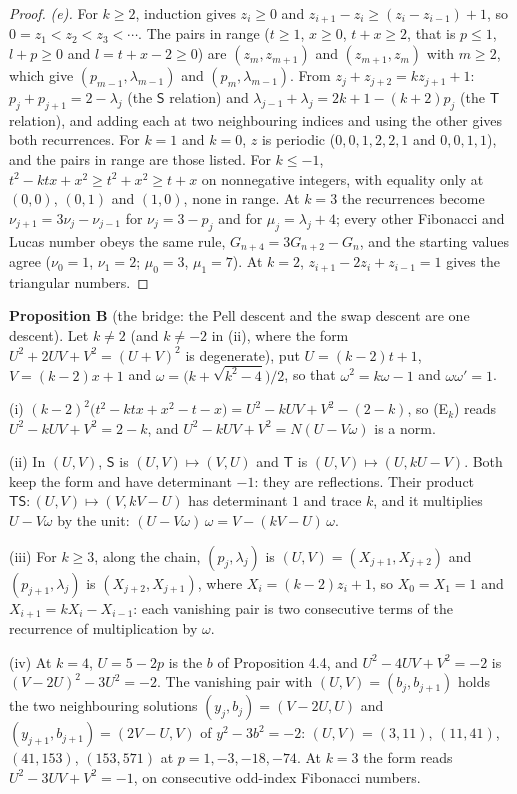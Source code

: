 \documentclass[11pt]{article}
\begin{document}
\begin{proof}
\emph{(e).} For $k\ge2$, induction gives $z_i\ge0$ and $z_{i+1}-z_i\ge(z_i-z_{i-1})+1$, so $0=z_1<z_2<z_3<\cdots$. The pairs in range ($t\ge1$, $x\ge0$, $t+x\ge2$, that is $p\le1$, $l+p\ge0$ and $l=t+x-2\ge0$) are $(z_m,z_{m+1})$ and $(z_{m+1},z_m)$ with $m\ge2$, which give $(p_{m-1},\lambda_{m-1})$ and $(p_m,\lambda_{m-1})$. From $z_j+z_{j+2}=kz_{j+1}+1$: $p_j+p_{j+1}=2-\lambda_j$ (the $\mathsf{S}$ relation) and $\lambda_{j-1}+\lambda_j=2k+1-(k+2)p_j$ (the $\mathsf{T}$ relation), and adding each at two neighbouring indices and using the other gives both recurrences. For $k=1$ and $k=0$, $z$ is periodic ($0,0,1,2,2,1$ and $0,0,1,1$), and the pairs in range are those listed. For $k\le-1$, $t^2-ktx+x^2\ge t^2+x^2\ge t+x$ on nonnegative integers, with equality only at $(0,0)$, $(0,1)$ and $(1,0)$, none in range. At $k=3$ the recurrences become $\nu_{j+1}=3\nu_j-\nu_{j-1}$ for $\nu_j=3-p_j$ and for $\mu_j=\lambda_j+4$; every other Fibonacci and Lucas number obeys the same rule, $G_{n+4}=3G_{n+2}-G_n$, and the starting values agree ($\nu_0=1$, $\nu_1=2$; $\mu_0=3$, $\mu_1=7$). At $k=2$, $z_{i+1}-2z_i+z_{i-1}=1$ gives the triangular numbers.
\end{proof}

\noindent\textbf{Proposition B} (the bridge: the Pell descent and the swap descent are one descent). Let $k\ne2$ (and $k\ne-2$ in (ii), where the form $U^2+2UV+V^2=(U+V)^2$ is degenerate), put $U=(k-2)t+1$, $V=(k-2)x+1$ and $\omega=\bigl(k+\sqrt{k^2-4}\bigr)/2$, so that $\omega^2=k\omega-1$ and $\omega\omega'=1$.

(i) $(k-2)^2\bigl(t^2-ktx+x^2-t-x\bigr)=U^2-kUV+V^2-(2-k)$, so (E$_k$) reads $U^2-kUV+V^2=2-k$, and $U^2-kUV+V^2=N(U-V\omega)$ is a norm.

(ii) In $(U,V)$, $\mathsf{S}$ is $(U,V)\mapsto(V,U)$ and $\mathsf{T}$ is $(U,V)\mapsto(U,kU-V)$. Both keep the form and have determinant $-1$: they are reflections. Their product $\mathsf{T}\mathsf{S}:(U,V)\mapsto(V,kV-U)$ has determinant $1$ and trace $k$, and it multiplies $U-V\omega$ by the unit: $(U-V\omega)\,\omega=V-(kV-U)\,\omega$.

(iii) For $k\ge3$, along the chain, $(p_j,\lambda_j)$ is $(U,V)=(X_{j+1},X_{j+2})$ and $(p_{j+1},\lambda_j)$ is $(X_{j+2},X_{j+1})$, where $X_i=(k-2)z_i+1$, so $X_0=X_1=1$ and $X_{i+1}=kX_i-X_{i-1}$: each vanishing pair is two consecutive terms of the recurrence of multiplication by $\omega$.

(iv) At $k=4$, $U=5-2p$ is the $b$ of Proposition 4.4, and $U^2-4UV+V^2=-2$ is $(V-2U)^2-3U^2=-2$. The vanishing pair with $(U,V)=(b_j,b_{j+1})$ holds the two neighbouring solutions $(y_j,b_j)=(V-2U,U)$ and $(y_{j+1},b_{j+1})=(2V-U,V)$ of $y^2-3b^2=-2$: $(U,V)=(3,11)$, $(11,41)$, $(41,153)$, $(153,571)$ at $p=1,-3,-18,-74$. At $k=3$ the form reads $U^2-3UV+V^2=-1$, on consecutive odd-index Fibonacci numbers.
\end{document}
